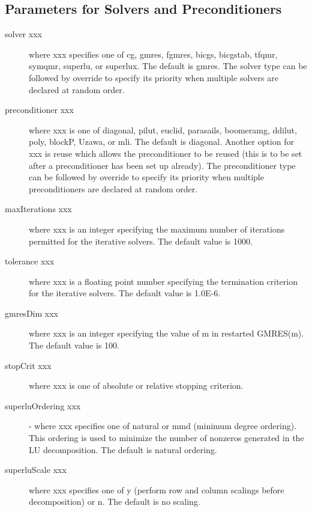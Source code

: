 \subsection{Parameters for Solvers and Preconditioners}

\begin{description}
\item[solver xxx] where xxx specifies one of {\sf cg}, {\sf gmres},
           {\sf fgmres}, {\sf bicgs}, {\sf bicgstab}, {\sf tfqmr}, 
           {\sf symqmr}, {\sf superlu}, or {\sf superlux}.  The 
           default is {\sf gmres}.
           The solver type can be followed by {\sf override} to
           specify its priority when multiple solvers are declared
           at random order.
\item[preconditioner xxx] where xxx is one of {\sf diagonal}, {\sf pilut},
           {\sf euclid}, {\sf parasails}, {\sf boomeramg}, {\sf ddilut}, 
           {\sf poly}, {\sf blockP}, {\sf Uzawa}, or {\sf mli}. The 
           default is {\sf diagonal}.  Another option for 
           xxx is {\sf reuse} which allows the preconditioner to be reused 
           (this is to be set after a preconditioner has been set up already).
           The preconditioner type can be followed by {\sf override} to
           specify its priority when multiple preconditioners are declared
           at random order.
\item[maxIterations xxx] where xxx is an integer specifying the maximum 
           number of iterations permitted for the iterative solvers.
           The default value is 1000.
\item[tolerance xxx] where xxx is a floating point number specifying the 
           termination criterion for the iterative solvers.  The default 
           value is 1.0E-6.
\item[gmresDim xxx] where xxx is an integer specifying the value of m in
           restarted GMRES(m).  The default value is 100.
\item[stopCrit xxx] where xxx is one of {\sf absolute} or {\sf relative}
           stopping criterion.
\item[superluOrdering xxx] - where xxx specifies one of {\sf natural} or
           {\sf mmd} (minimum degree ordering).  This ordering
           is used to minimize the number of nonzeros generated
           in the LU decomposition.  The default is natural ordering.
\item[superluScale xxx] where xxx specifies one of {\sf y} (perform row
           and column scalings before decomposition) or {\sf n}.
           The default is no scaling.
\end{description}

